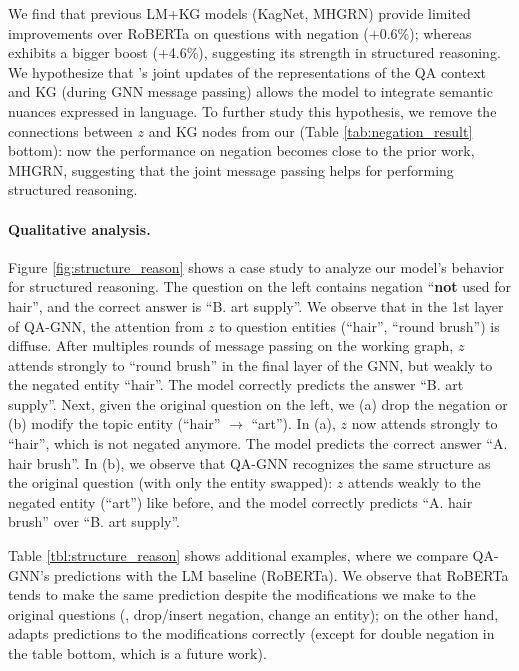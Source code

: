 We find that previous LM+KG models (KagNet, MHGRN) provide limited improvements over RoBERTa on questions with negation (+0.6\%); whereas \methodname exhibits a bigger boost (+4.6\%), suggesting its strength in structured reasoning.
We hypothesize that \methodname's joint updates of the representations of the QA context and KG (during GNN message passing) allows the model to integrate semantic nuances expressed in language.
To further study this hypothesis, we remove the connections between $z$ and KG nodes from our \methodname (Table \ref{tab:negation_result} bottom): now the performance on negation becomes close to the prior work, MHGRN, suggesting that the joint message passing helps for performing structured reasoning.





\paragraph{Qualitative analysis.}


Figure \ref{fig:structure_reason} shows a case study to analyze our model's behavior for structured reasoning. 
The question on the left contains negation ``\textbf{not} used for hair'', and the correct answer is ``B. art supply''.
We observe that in the 1st layer of QA-GNN, the attention from $z$ to question entities (``hair'', ``round brush'') is diffuse. After multiples rounds of message passing on the working graph, $z$ attends strongly to ``round brush'' in the final layer of the GNN, but weakly to the negated entity ``hair''. The model correctly predicts the answer ``B. art supply''.
Next, given the original question on the left, we (a) drop the negation or (b) modify the topic entity (``hair'' $\!\rightarrow\!$ ``art'').
In (a), $z$ now attends strongly to ``hair'', which is not negated anymore. The model predicts the correct answer ``A. hair brush''.
In (b), we observe that QA-GNN recognizes the same structure as the original question (with only the entity swapped): $z$ attends weakly to the negated entity (``art'') like before, and the model correctly predicts ``A. hair brush'' over ``B. art supply''.


Table \ref{tbl:structure_reason} shows additional examples, where we compare QA-GNN's predictions with the LM baseline (RoBERTa).
We observe that RoBERTa tends to make the same prediction despite the modifications we make to the original questions (\eg, drop/insert negation, change an entity); on the other hand, \methodname adapts predictions to the modifications correctly (except for double negation in the table bottom, which is a future work). 





